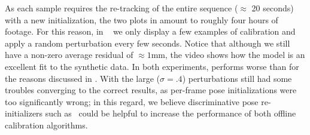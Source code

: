 As each sample requires the re-tracking of the entire sequence ($\approx$ 20 seconds) with a new initialization, the two plots in  amount to roughly four hours of footage. For this reason, in ~\VideoSynth{} we only display a few examples of calibration 
and apply a random perturbation every few seconds.
Notice that although we still have a non-zero average residual of $\approx 1$mm, the video shows how the model is an excellent fit to the synthetic data.  
In both experiments, \OfflineHard{} performs worse than \OfflineSoft{} for the reasons discussed in . With the large ($\sigma=.4$) perturbations \OfflineSoft{} still had some troubles converging to the correct results, as per-frame pose initializations 
were too significantly wrong; in this regard, we believe discriminative pose re-initializers such as~\cite{oberweger2015hands} could be helpful to increase the performance of both offline calibration algorithms.

